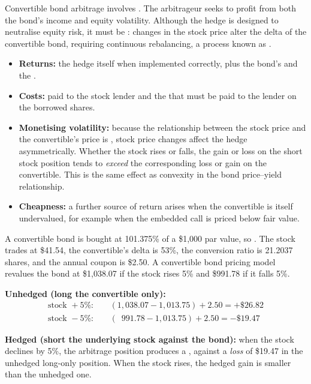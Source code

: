 Convertible bond arbitrage involves . The arbitrageur seeks to
profit from both the bond's income and equity volatility. Although the hedge is
designed to neutralise equity risk, it must be : changes
in the stock price alter the delta of the convertible bond, requiring continuous
rebalancing, a process known as .

\begin{itemize}
\item \textbf{Returns:} the hedge itself when implemented correctly, plus the
bond's  and the .
\item \textbf{Costs:}  paid to the stock lender and the
 that must be paid to the lender on the borrowed shares.
\item \textbf{Monetising volatility:} because the relationship between the stock
price and the convertible's price is , stock price changes affect
the hedge asymmetrically. Whether the stock rises or falls, the gain or loss on
the short stock position tends to \emph{exceed} the corresponding loss or gain on
the convertible. This is the same effect as convexity in the bond price--yield
relationship.
\item \textbf{Cheapness:} a further source of return arises when the convertible
is itself undervalued, for example when the embedded call is priced below fair
value.
\end{itemize}

\begin{imexbox}[title={Hedged against unhedged, on a $\pm$5\% move}]
A convertible bond is bought at 101.375\% of a \$1,000 par value, so
. The stock trades at \$41.54, the convertible's delta is 53\%,
the conversion ratio is 21.2037 shares, and the annual coupon is \$2.50. A
convertible bond pricing model revalues the bond at \$1,038.07 if the stock rises
5\% and \$991.78 if it falls 5\%.

\medskip
\textbf{Unhedged (long the convertible only):}
\begin{align*}
\text{stock } +5\%: &\quad (1{,}038.07 - 1{,}013.75) + 2.50 = +\$26.82 \\
\text{stock } -5\%: &\quad (\phantom{0}991.78 - 1{,}013.75) + 2.50 = -\$19.47
\end{align*}

\textbf{Hedged (short the underlying stock against the bond):} when the stock
declines by 5\%, the arbitrage position produces a ,
against a \emph{loss} of \$19.47 in the unhedged long-only position. When the
stock rises, the hedged gain is smaller than the unhedged one.
\end{imexbox}

